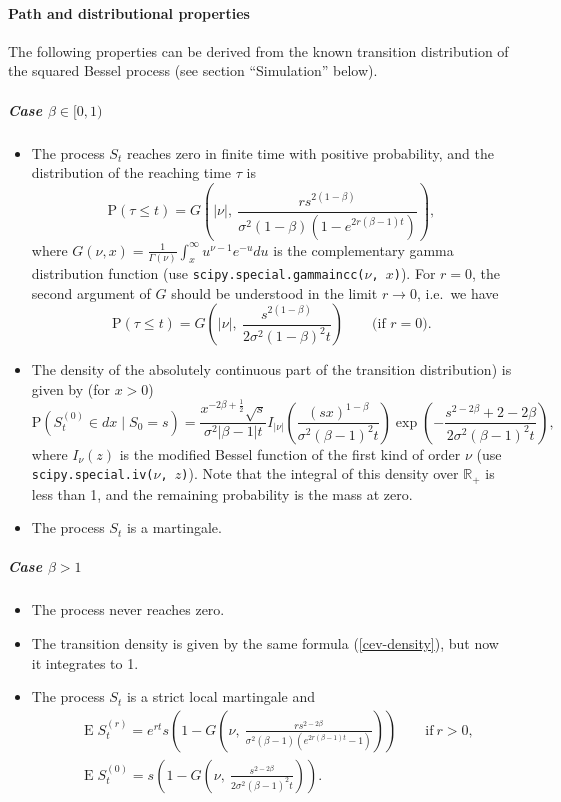\documentclass[a4paper,11pt,titlepage]{article}
\renewcommand{\P}{\mathrm{P}}
\newcommand{\R}{\mathbb{R}}
\DeclareMathOperator{\E}{E}
\theoremstyle{remark}
\begin{document}
\paragraph{Path and distributional properties}
The following properties can be derived from the known transition distribution of the squared Bessel process (see section ``Simulation'' below).

\subparagraph{Case $\beta\in[0,1)$}
\begin{itemize}
\item The process $S_t$ reaches zero in finite time with positive probability, and the distribution of the reaching time $\tau$ is
\[
\P(\tau \le t) 
  = G \left( 
    |\nu|,\ \frac{rs^{2(1-\beta)}}{\sigma^2(1-\beta)(1-e^{2r(\beta-1)t})} 
  \right),
\]
where $G(\nu,x) = \frac{1}{\Gamma(\nu)} \int_x^\infty u^{\nu-1}e^{-u}du$ is the complementary gamma distribution function (use \texttt{scipy.special.gammaincc($\nu$,\,$x$)}).
For $r=0$, the second argument of $G$ should be understood in the limit $r\to0$, i.e.\ we have
\[
\P(\tau\le t) = G \left(
  |\nu|,\ \frac{s^{2(1-\beta)}}{2\sigma^2(1-\beta)^2t} 
\right) 
\qquad \text{(if $r=0$)}.
\]

\item The density of the absolutely continuous part of the transition distribution) is given by (for $x>0$)
\begin{equation}
\label{cev-density}
\P(S_t^{(0)}\in dx \mid S_0=s) = 
  \frac{x^{-2\beta+\frac12}\sqrt s}
       {\sigma^2|\beta-1|t} 
  I_{|\nu|} \left( 
    \frac{(sx)^{1-\beta}}{\sigma^2(\beta-1)^2 t}
  \right) 
  \exp \left( 
    -\frac{s^{2-2\beta} + {2-2\beta}}{2\sigma^2(\beta-1)^2t} 
  \right),
\end{equation}
where $I_\nu(z)$ is the modified Bessel function of the first kind of order $\nu$ (use \texttt{scipy.\allowbreak special.iv($\nu$,\,$z$)}).
Note that the integral of this density over $\R_+$ is less than 1, and the remaining probability is the mass at zero.

\item The process $S_t$ is a martingale.
\end{itemize}

\subparagraph{Case $\beta>1$}
\begin{itemize}
\item The process never reaches zero.

\item The transition density is given by the same formula (\ref{cev-density}), but now it integrates to 1.

\item The process $S_t$ is a strict local martingale and
\begin{align*}
&\E S_t^{(r)} = e^{rt}s \left( 1 - 
  G\left(
    \nu,\ 
    \frac{rs^{2-2\beta}}{\sigma^2(\beta-1)(e^{2r(\beta-1)t}-1)} 
  \right) 
\right) \qquad \text{if}\ r>0,\\
&\E S_t^{(0)} = s \left( 1 - 
  G \left( \nu,\ \frac{s^{2-2\beta}}{2\sigma^2(\beta-1)^2t} \right)
\right).
\end{align*}
\end{itemize}
\end{document}
